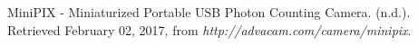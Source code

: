 \documentclass[preprint,12pt]{elsarticle}
\begin{document}
\begin{thebibliography}{00}



MiniPIX - Miniaturized Portable USB Photon Counting Camera. (n.d.). Retrieved February 02, 2017, from \textit{http://advacam.com/camera/minipix}.

%
%
%
%
%	
%
%
%
%
%  
%
%

\end{thebibliography}
\end{document}
